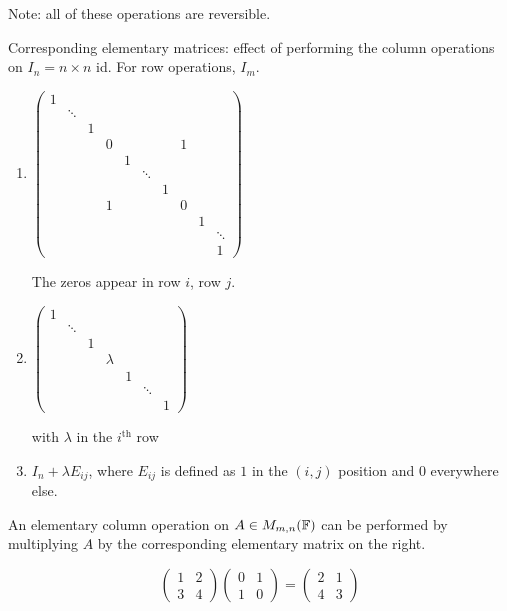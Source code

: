 \documentclass[a4paper]{article}
\begin{document}
Note: all of these operations are reversible. 

Corresponding elementary matrices: effect of performing the column operations on $ I_{n} = n \times n $ id.  For row operations, $ I_{m} $.

\begin{enumerate}
	\item $ \begin{pmatrix}
		1\\
		& \ddots\\
		& & 1\\
		& & & 0 & & & & 1\\
		& & & & 1\\
		& & & & & \ddots\\
		& & & & & & 1\\
		& & & 1 & & & & 0\\
		& & & & & & & & 1\\
		& & & & & & & & & \ddots\\
		& & & & & & & & & 1
	\end{pmatrix} $
	
	The zeros appear in row $ i $, row $ j $.
	
	\item $ \begin{pmatrix}
	1 & & & & & &\\
	& \ddots & & & & & \\
	& & 1 & & & & \\
	& & & \lambda & & & \\
	& & & & 1 & & \\
	& & & & & \ddots & \\
	& & & & & & 1
	\end{pmatrix} $
	
	with $ \lambda $ in the $ i^{\text{th}} $ row
	
	\item $ I_{n} + \lambda E_{ij}  $, where $ E_{ij} $ is defined as $ 1 $ in the $ (i,j) $ position and $ 0 $ everywhere else.
	
\end{enumerate}

An elementary column operation on $ A \in M_{m,n}(\mathbb{F}) $ can be performed by multiplying $ A $ by the corresponding elementary matrix on the right.

\begin{ex}
	\[ \begin{pmatrix}
	1 & 2\\
	3 & 4
	\end{pmatrix} \begin{pmatrix}
	0 & 1 \\
	1 & 0
	\end{pmatrix} = \begin{pmatrix}
	2 & 1\\
	4 & 3
	\end{pmatrix} \]
\end{ex}
\end{document}
